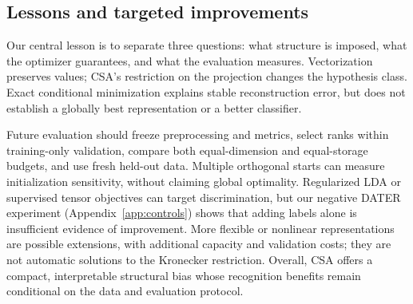 \subsection{Lessons and targeted improvements}
Our central lesson is to separate three questions: what structure is imposed,
what the optimizer guarantees, and what the evaluation measures. Vectorization
preserves values; CSA's restriction on the projection changes the hypothesis
class. Exact conditional minimization explains stable reconstruction error,
but does not establish a globally best representation or a better classifier.

Future evaluation should freeze preprocessing and metrics, select ranks within
training-only validation, compare both equal-dimension and equal-storage
budgets, and use fresh held-out data. Multiple orthogonal starts can measure
initialization sensitivity, without claiming global optimality. Regularized LDA
or supervised tensor objectives can target discrimination, but our negative
DATER experiment (Appendix~\ref{app:controls}) shows that adding labels alone
is insufficient evidence of improvement. More flexible or nonlinear representations
are possible extensions, with additional capacity and validation costs; they are
not automatic solutions to the Kronecker restriction. Overall, CSA offers a
compact, interpretable structural bias whose recognition benefits remain
conditional on the data and evaluation protocol.

